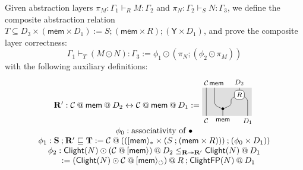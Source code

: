 \documentclass[acmsmall,screen,review,anonymous]{acmart}
\newcommand{\kw}[1]{\ensuremath{ \mathsf{#1} }}
\newcommand{\jr}{\mathsf{Y}}
\begin{document}
Given abstraction layers
$\pi_M: \Gamma_1 \vdash_R M : \Gamma_2$
and
$\pi_N: \Gamma_2 \vdash_S N : \Gamma_3$,
we define the composite abstraction relation
$T \subseteq D_3 \times (\kw{mem} \times D_1) := S \mathbin; (\kw{mem} \times R) \mathbin; (\jr \times D_1) $,
and prove the composite layer correctness:
\[
  \Gamma_1 \vdash_T (M \odot N) : \Gamma_3 := \phi_1 \odot (\pi_N \mathbin; (\phi_2 \odot \pi_M))
\]
with the following auxiliary definitions:
\[
  \begin{array}{c}
    \mathbf{R'}: \mathcal{C} \mathbin@ \kw{mem} \mathbin@ D_2
    \leftrightarrow \mathcal{C}\mathbin@ \kw{mem} \mathbin@ D_1 :=
    \begin{tikzpicture}[xscale=0.35,yscale=0.3,baseline=1em]
      \footnotesize
      \coordinate (C-bottom) at (0.5,0);
      \coordinate (C-top) at (0.5,4);
      \coordinate (join) at (2.5,1);
      \coordinate (d2) at (4.5,4);
      \coordinate (d1) at (5.5,0);
      \coordinate (mem-bottom) at (2.5,0);
      \coordinate (mem-top) at (1.5,4);
      \coordinate (R) at (4.5,3);
      \fill[scsdbg] (0,0) rectangle (6,4);
      \draw (C-top) node[above] {$\mathcal{C}$} -- (C-bottom) node[below] {$\mathcal{C}$};
      \draw (R) [rounded corners] -- (5.5,2.5) -- (d1) node[below] {$D_1$};
      \draw (R) .. controls +(-1,-0.5) .. (3.5,2);
      \draw (join) node {$\bullet$} .. controls +(1,0.5) .. (3.5,2);
      \draw (d2) node[above] {$D_2$} -- (R) node[draw,fill=white,rounded corners] {$R$};
      \draw (mem-top) node[above] {$\;\;\kw{mem}$}
      [rounded corners] -- (1.5,1.5) -- (join);
      \draw (join) -- (2.5,0) node[below]{\kw{mem}};
    \end{tikzpicture}
    \\
    \phi_0: \text{associativity of $\bullet$}\\
    \phi_1: \mathbf{S} \mathbin; \mathbf{R'} \sqsubseteq \mathbf{T}
    := \mathcal{C} \mathbin@ (([\kw{mem}\rangle_* \times (S \mathbin; (\kw{mem} \times R)))\mathbin; (\phi_0 \times D_1) )
    \\
    \phi_2: \kw{Clight}(N) \odot (\mathcal{C} \mathbin@ [\kw{mem}\rangle) \mathbin@ D_2
    \le_{\mathbf{R} \twoheadrightarrow \mathbf{R'}}
    \kw{Clight}(N) \mathbin@ D_1\\
    \quad := (\kw{Clight}(N) \odot \mathcal{C} \mathbin@ [\kw{mem}\rangle_\circlearrowleft)\mathbin@ R
    \mathbin; \kw{ClightFP}(N) \mathbin@ D_1
    \\
  \end{array}
\]
\end{document}
